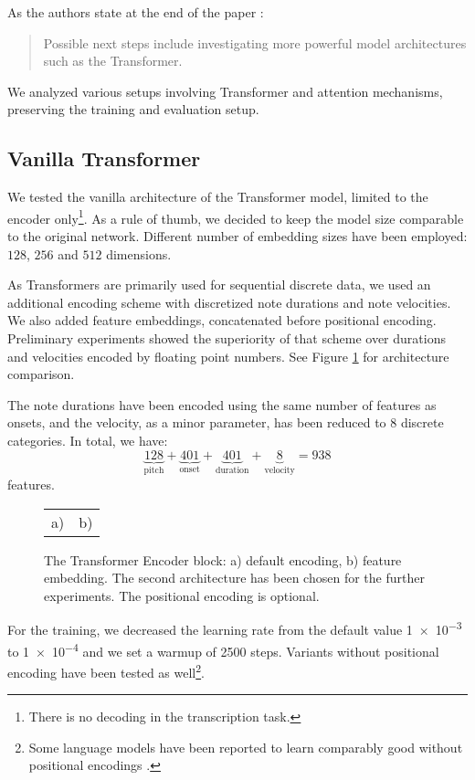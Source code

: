 As the authors state at the end of the paper \cite{Liu2022}: \begin{quote}Possible next steps include investigating more powerful model architectures such as the Transformer.\end{quote} We analyzed various setups involving Transformer and attention mechanisms, preserving the training and evaluation setup.

\subsection{Vanilla Transformer}

We tested the vanilla architecture of the Transformer model, limited to the encoder only\footnote{There is no decoding in the transcription task.}. As a rule of thumb, we decided to keep the model size comparable to the original network. Different number of embedding sizes have been employed: $128$, $256$ and $512$ dimensions. 

As Transformers are primarily used for sequential discrete data, we used an additional encoding scheme with discretized note durations and note velocities. We also added feature embeddings, concatenated before positional encoding. Preliminary experiments showed the superiority of that scheme over durations and velocities encoded by floating point numbers. See Figure \ref{vanilla_transformer_encoder_with_embedding} for architecture comparison.

The note durations have been encoded using the same number of features as onsets, and the velocity, as a minor parameter, has been reduced to 8 discrete categories. In total, we have: \[\underbrace{128}_{\textrm{pitch}}+\underbrace{401}_{\textrm{onset}}+\underbrace{401}_{\textrm{duration}}+\underbrace{8}_{\textrm{velocity}} = 938\] features.

\begin{figure}[ht!]
\centering
\begin{tabular}{cc}a)
 & b)

\end{tabular}
\caption[The Transformer Encoder block.]{The Transformer Encoder block: a) default encoding, b) feature embedding. The second architecture has been chosen for the further experiments. The positional encoding is optional.}
\label{vanilla_transformer_encoder_with_embedding}
\end{figure}

For the training, we decreased the learning rate from the default value \num{1e-3} to \num{1e-4} and we set a warmup of 2500 steps. Variants without positional encoding have been tested as well\footnote{Some language models have been reported to learn comparably good without positional encodings \cite{Haviv2022}.}.

